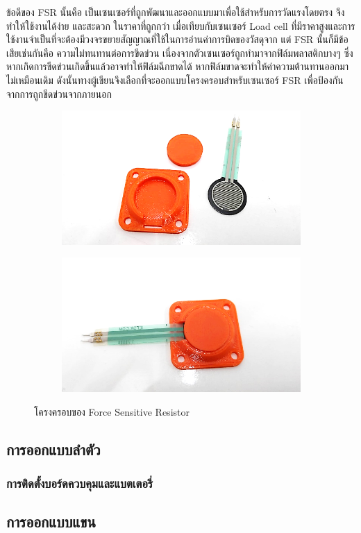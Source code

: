 ข้อดีของ FSR นั้นคือ เป็นเซนเซอร์ที่ถูกพัฒนาและออกแบบมาเพื่อใช้สำหรับการวัดแรงโดยตรง จึงทำให้ใช้งานได้ง่าย และสะดวก ในราคาที่ถูกกว่า 
เมื่อเทียบกับเซนเซอร์ Load cell ที่มีราคาสูงและการใช้งานจำเป็นที่จะต้องมีวงจรขยายสัญญาณที่ใช้ในการอ่านค่าการบิดของวัสดุจาก 
แต่ FSR นั้นก็มีข้อเสียเช่นกันคือ ความไม่ทนทานต่อการขีดข่วน เนื่องจากตัวเซนเซอร์ถูกทำมาจากฟิล์มพลาสติกบางๆ ซึ่งหากเกิดการขีดข่วนเกิดขึ้นแล้วอาจทำให้ฟิล์มฉีกขาดได้ 
หากฟิล์มขาดจะทำให้ค่าความต้านทานออกมาไม่เหมือนเดิม ดังนั้นทางผู้เขียนจึงเลือกที่จะออกแบบโครงครอบสำหรับเซนเซอร์ FSR เพื่อป้องกันจากการถูกขีดข่วนจากภายนอก
\begin{figure}[h!]
  \centering
  \begin{subfigure}[b]{0.4\linewidth}
    \includegraphics[width=\linewidth]{chapter4/images/FSR_cover1.png}
  \end{subfigure}
  \begin{subfigure}[b]{0.4\linewidth}
    \includegraphics[width=\linewidth]{chapter4/images/FSR_cover2.png}
  \end{subfigure}
  \caption{โครงครอบของ Force Sensitive Resistor}
  \label{fig:FSR_cover}
\end{figure}

\subsection{การออกแบบลำตัว}
\subsubsection{การติดตั้งบอร์ดควบคุมและแบตเตอรี่}

\subsection{การออกแบบแขน}



